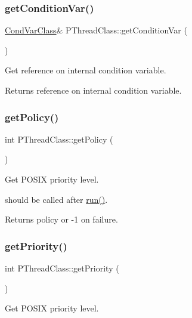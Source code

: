 \subsubsection{\texorpdfstring{get\+Condition\+Var()}{getConditionVar()}}
{\footnotesize\ttfamily \hyperlink{classCondVarClass}{Cond\+Var\+Class}\& P\+Thread\+Class\+::get\+Condition\+Var (\begin{DoxyParamCaption}{ }\end{DoxyParamCaption})\hspace{0.3cm}{\ttfamily [inline]}}

Get reference on internal condition variable. \begin{DoxyReturn}{Returns}
reference on internal condition variable. 
\end{DoxyReturn}
\mbox{\label{classPThreadClass_a8a77ce45b960ad25c2bbdcc4ba8341b6}} 
\subsubsection{\texorpdfstring{get\+Policy()}{getPolicy()}}
{\footnotesize\ttfamily int P\+Thread\+Class\+::get\+Policy (\begin{DoxyParamCaption}{ }\end{DoxyParamCaption})}

Get P\+O\+S\+IX priority level.

should be called after \hyperlink{classPThreadClass_a9e60b014b8e8ba6892cc322b6ba183d8}{run()}. \begin{DoxyReturn}{Returns}
policy or -\/1 on failure. 
\end{DoxyReturn}
\mbox{\label{classPThreadClass_aca9cc33ac2e0d2f25e1fa993c78e68cc}} 
\subsubsection{\texorpdfstring{get\+Priority()}{getPriority()}}
{\footnotesize\ttfamily int P\+Thread\+Class\+::get\+Priority (\begin{DoxyParamCaption}{ }\end{DoxyParamCaption})}

Get P\+O\+S\+IX priority level.

